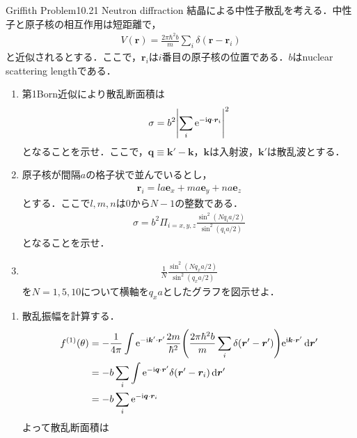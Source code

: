 \documentclass{report}
\begin{document}
  \begin{myexc}{Griffith Problem10.21 Neutron diffraction}{}
  結晶による中性子散乱を考える．中性子と原子核の相互作用は短距離で，
  \begin{align}
    V(\bm{r}) = \frac{2\pi\hbar^2 b}{m} \sum_{i}\delta(\bm{r} - \bm{r}_i)
  \end{align}
  と近似されるとする．ここで，$\bm{r}_i$は$i$番目の原子核の位置である．$b$はnuclear scattering lengthである．
  \begin{enumerate}
    \item 第1Born近似により散乱断面積は
          \begin{align}
            \sigma = b^2 \abs{\sum_{i} \mathrm{e}^{-\mathrm{i} \bm{q}\cdot\bm{r}_i}}^2
          \end{align}
          となることを示せ．ここで，$\bm{q}\equiv\bm{k}' - \bm{k}$，$\bm{k}$は入射波，$\bm{k}'$は散乱波とする．
    \item 原子核が間隔$a$の格子状で並んでいるとし，
          \begin{align}
            \bm{r}_i = la\bm{e}_x + ma\bm{e}_y + na\bm{e}_z
          \end{align}
          とする．ここで$l,m,n$は0から$N-1$の整数である．
          \begin{align}
            \sigma = b^2 \Pi_{i =x,y,z} \frac{\sin^2(Nq_i a/2)}{\sin^2 (q_i a/2)}
          \end{align}
          となることを示せ．
    \item \begin{align}
            \frac{1}{N}\frac{\sin^2(Nq_x a/2)}{\sin^2 (q_x a/2)}
          \end{align}
          を$N=1,5,10$について横軸を$q_xa$としたグラフを図示せよ．
  \end{enumerate}
  \tcblower
  \begin{enumerate}
    \item 散乱振幅を計算する．
          \begin{align}
            f^{(1)}(\theta) &= -\frac{1}{4\pi} \int \mathrm{e}^{-\mathrm{i}\bm{k}' \cdot \bm{r}'} \frac{2m}{\hbar^2} \qty(\frac{2\pi\hbar^2 b}{m} \sum_{i} \delta(\bm{r}' - \bm{r}'))\mathrm{e}^{\mathrm{i} \bm{k}\cdot\bm{r}'} \dd{\bm{r}'}\\
            &= -b \sum_{i} \int \mathrm{e}^{-\mathrm{i}\bm{q}\cdot \bm{r}'} \delta(\bm{r}' - \bm{r}_i) \dd{\bm{r}'}\\
            &= -b \sum_{i} \mathrm{e}^{-\mathrm{i} \bm{q}\cdot\bm{r}_i}
          \end{align}
          よって散乱断面積は
          \begin{align}

\end{align}
\end{enumerate}
\end{myexc}
\end{document}
